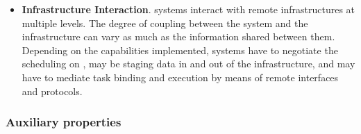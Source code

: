 \documentclass{sig-alternate}
\begin{document}
\begin{itemize}
\item \textbf{Infrastructure Interaction}. \pilot systems interact with remote
  infrastructures at multiple levels. The degree of coupling between the \pilot
  system and the infrastructure can vary as much as the information shared
  between them. Depending on the capabilities implemented, \pilot systems have
  to negotiate the scheduling on \pilots, may be staging data in and out of the
  infrastructure, and may have to mediate task binding and execution by means
  of remote interfaces and protocols.

   


\end{itemize}


\subsubsection{Auxiliary properties}
\label{sec:auxprops}
\end{document}
